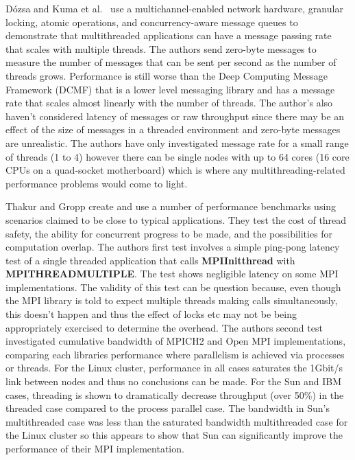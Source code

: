 \documentclass{acm_proc_article-sp}
\renewcommand{\_}{\underscore\hspace{0pt}}
\begin{document}
D\'{o}zsa and Kuma et al.\ \cite{Kumar} use a multichannel-enabled network
hardware, granular locking, atomic operations, and concurrency-aware message
queues to demonstrate that multithreaded applications can have a message passing
rate that scales with multiple threads. The authors send zero-byte messages to
measure the number of messages that can be sent per second as the number of
threads grows. Performance is still worse than the Deep Computing Message
Framework (DCMF) that is a lower level messaging library and has a message rate
that scales almost linearly with the number of threads. The author's also
haven't considered latency of messages or raw throughput since there may be an
effect of the size of messages in a threaded environment and zero-byte messages
are unrealistic. The authors have only investigated message rate for a small
range of threads (1 to 4) however there can be single nodes with up to 64 cores
(16 core CPUs on a quad-socket motherboard) which is where any
multithreading-related performance problems would come to light.

Thakur and Gropp \cite{Thakur2009} create and use a number of performance
benchmarks using scenarios claimed to be close to typical applications. They
test the cost of thread safety, the ability for concurrent progress to be made,
and the possibilities for computation overlap. The authors first test involves a
simple ping-pong latency test of a single threaded application that calls
\textbf{MPI\_Init\_thread} with \textbf{MPI\_THREAD\_MULTIPLE}. The test shows
negligible latency on some MPI implementations. The validity of this test can be
question because, even though the MPI library is told to expect multiple threads
making calls simultaneously, this doesn't happen and thus the effect of locks
etc may not be being appropriately exercised to determine the overhead. The
authors second test investigated cumulative bandwidth of MPICH2 and Open MPI
implementations, comparing each libraries performance where parallelism is
achieved via processes or threads. For the Linux cluster, performance in all
cases saturates the 1Gbit/s link between nodes and thus no conclusions can be
made. For the Sun and IBM cases, threading is shown to dramatically decrease
throughput (over 50\%) in the threaded case compared to the process parallel
case. The bandwidth in Sun's multithreaded case was less than the saturated
bandwidth multithreaded case for the Linux cluster so this appears to show that
Sun can significantly improve the performance of their MPI implementation.
\end{document}
